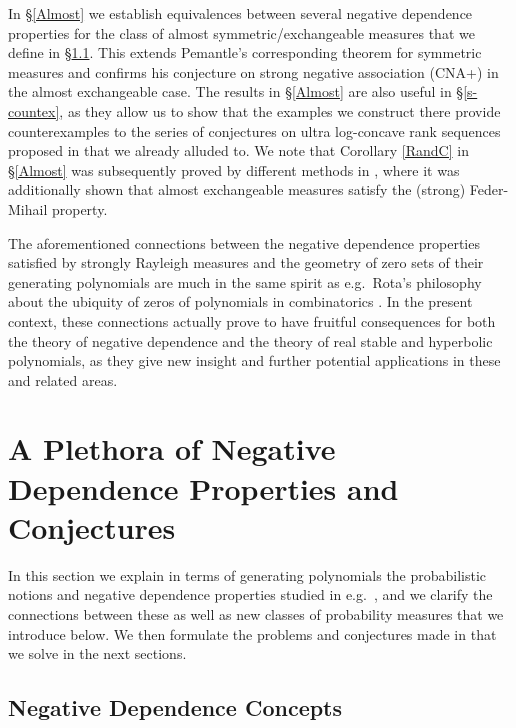 \documentclass[10pt,reqno]{amsart}
\theoremstyle{plain}
\theoremstyle{definition}
\theoremstyle{remark}
\begin{document}
In \S \ref{Almost} we establish
equivalences between several negative dependence properties for the class of
almost symmetric/exchangeable measures that we define in \S \ref{s21}. This 
extends Pemantle's corresponding theorem for symmetric measures and 
confirms his conjecture on strong negative
association (CNA+) in the almost exchangeable case. The results in 
\S \ref{Almost} 
are also useful in \S \ref{s-countex}, as they allow us to show that the 
examples we construct
there provide counterexamples to the series of conjectures on ultra 
log-concave rank sequences proposed in \cite{P,W} that we already alluded to. 
We note that Corollary \ref{RandC} in \S \ref{Almost} was subsequently 
proved by different methods in \cite{KN}, where it was additionally shown that 
almost exchangeable measures satisfy the (strong) Feder-Mihail property.

The aforementioned connections between
the negative dependence properties satisfied by strongly Rayleigh measures
and the geometry of zero sets of their generating polynomials are much in
the same spirit as e.g.~Rota's philosophy about the ubiquity of zeros of 
polynomials in combinatorics \cite{rota}. In the present 
context, these connections actually prove to have fruitful consequences for 
both the theory of negative dependence and the theory of 
real stable and hyperbolic polynomials, as they give new insight and further 
potential applications in these and related areas.

\section{A Plethora of Negative Dependence Properties 
and Conjectures}\label{s2-plet}

In this section we explain in terms of generating 
polynomials the probabilistic notions and negative 
dependence properties studied in e.g.~\cite{L2,P,W}, and we clarify the 
connections between these as well as 
new classes of probability measures that we introduce 
below. We then formulate the problems and conjectures 
made in \cite{L2,P,W} that we solve in the next sections.

\subsection{Negative Dependence Concepts}\label{s21}
\end{document}
